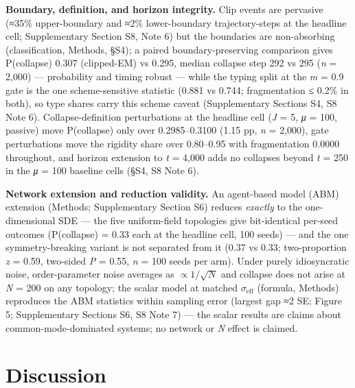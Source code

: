 \documentclass[11pt,letterpaper]{article}
\begin{document}
\textbf{Boundary, definition, and horizon integrity.} Clip events are pervasive (≈35\% upper-boundary and ≈2\% lower-boundary trajectory-steps at the headline cell; Supplementary Section S8, Note 6) but the boundaries are non-absorbing (classification, Methods, §S4); a paired boundary-preserving comparison gives P(collapse) 0.307 (clipped-EM) vs 0.295, median collapse step 292 vs 295 (\emph{n} = 2,000) --- probability and timing robust --- while the typing split at the \textbar{}\emph{m}\textbar{} = 0.9 gate is the one scheme-sensitive statistic (0.881 vs 0.744; fragmentation ≤ 0.2\% in both), so type shares carry this scheme caveat (Supplementary Sections S4, S8 Note 6). Collapse-definition perturbations at the headline cell (\emph{J} = 5, \emph{μ} = 100, passive) move P(collapse) only over 0.2985--0.3100 (1.15 pp, \emph{n} = 2,000), gate perturbations move the rigidity share over 0.80--0.95 with fragmentation 0.0000 throughout, and horizon extension to \emph{t} = 4,000 adds no collapses beyond \emph{t} = 250 in the \emph{μ} = 100 baseline cells (§S4, S8 Note 6).

\textbf{Network extension and reduction validity.} An agent-based model (ABM) extension (Methods; Supplementary Section S6) reduces \emph{exactly} to the one-dimensional SDE --- the five uniform-field topologies give bit-identical per-seed outcomes (P(collapse) = 0.33 each at the headline cell, 100 seeds) --- and the one symmetry-breaking variant is not separated from it (0.37 vs 0.33; two-proportion \emph{z} = 0.59, two-sided \emph{P} = 0.55, \emph{n} = 100 seeds per arm). Under purely idiosyncratic noise, order-parameter noise averages as \(\propto 1/\sqrt{N}\) and collapse does not arise at \emph{N} = 200 on any topology; the scalar model at matched \(\sigma_{\mathrm{eff}}\) (formula, Methods) reproduces the ABM statistics within sampling error (largest gap ≈2 SE; Figure 5; Supplementary Sections S6, S8 Note 7) --- the scalar results are claims about common-mode-dominated systems; no network or \emph{N} effect is claimed.

\section{Discussion}\label{discussion}
\end{document}
